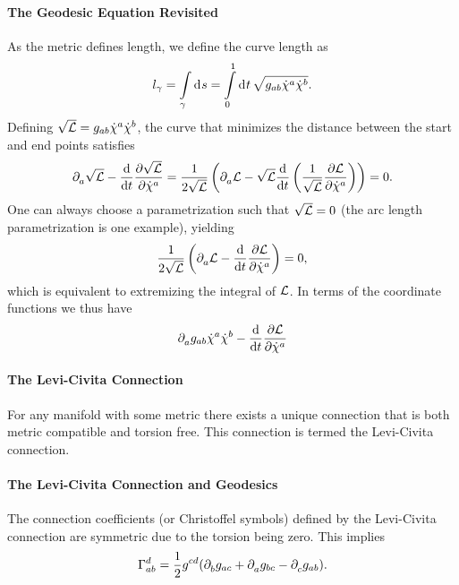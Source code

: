 \paragraph{The Geodesic Equation Revisited}
As the metric defines length, we define the curve length as
\begin{align*}
l_{\gamma} = \int\limits_{\gamma}^{}\dd[]{s} = \int\limits_{0}^{1}\dd[]{t}\sqrt{g_{ab}\dot{\chi}^{a}\dot{\chi}^{b}}.
\end{align*}
Defining $\sqrt{\mathcal{L}} = g_{ab}\dot{\chi}^{a}\dot{\chi}^{b}$, the curve that minimizes the distance between the start and end points satisfies
\begin{align*}
\partial^{}_{a}\sqrt{\mathcal{L}} - \dv{t}\pdv{\sqrt{\ensuremath{\mathcal{L}}}}{\dot{\chi}^{a}} = \frac{1}{2\sqrt{\mathcal{L}}}\left(\partial^{}_{a}\mathcal{L} - \sqrt{\mathcal{L}}\dv{t}\left(\frac{1}{\sqrt{\mathcal{L}}}\pdv{\ensuremath{\mathcal{L}}}{\dot{\chi}^{a}}\right)\right) = 0.
\end{align*}
One can always choose a parametrization such that $\sqrt{\mathcal{L}} = 0$ (the arc length parametrization is one example), yielding
\begin{align*}
\frac{1}{2\sqrt{\mathcal{L}}}\left(\partial^{}_{a}\mathcal{L} - \dv{t}\pdv{\ensuremath{\mathcal{L}}}{\dot{\chi}^{a}}\right) = 0,
\end{align*}
which is equivalent to extremizing the integral of $\mathcal{L}$. In terms of the coordinate functions we thus have
\begin{align*}
\partial^{}_{a}g_{ab}\dot{\chi}^{a}\dot{\chi}^{b} - \dv{t}\pdv{\ensuremath{\mathcal{L}}}{\dot{\chi}^{a}}
\end{align*}

\paragraph{The Levi-Civita Connection}
For any manifold with some metric there exists a unique connection that is both metric compatible and torsion free. This connection is termed the Levi-Civita connection.

\paragraph{The Levi-Civita Connection and Geodesics}
The connection coefficients (or Christoffel symbols) defined by the Levi-Civita connection are symmetric due to the torsion being zero. This implies
\begin{align*}
\chris{d}{a}{b} = \frac{1}{2}g^{cd}(\del{b}{g_{ac}} + \del{a}{g_{bc}} - \del{c}{g_{ab}}).
\end{align*}

